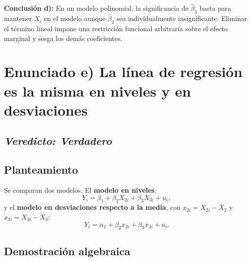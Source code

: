 \documentclass[12pt, letterpaper]{article}
\begin{document}
\begin{clave}
  \textbf{Conclusión d):} En un modelo polinomial, la significancia de
  $\hat{\beta}_3$ basta para mantener $X_i$ en el modelo aunque
  $\hat{\beta}_2$ sea individualmente insignificante. Eliminar el
  término lineal impone una restricción funcional arbitraria sobre el
  efecto marginal y sesga los demás coeficientes.
\end{clave}

\section{Enunciado e) La línea de regresión es la misma en niveles y en desviaciones}

\subsection*{\textit{Veredicto: \textbf{Verdadero}}}

\subsection{Planteamiento}

Se comparan dos modelos. El \textbf{modelo en niveles}:
\begin{equation}
  Y_i = \beta_1 + \beta_2 X_{2i} + \beta_3 X_{3i} + u_i,
  \label{eq:niveles}
\end{equation}
y el \textbf{modelo en desviaciones respecto a la media}, con
$x_{2i} = X_{2i} - \bar{X}_2$ y $x_{3i} = X_{3i} - \bar{X}_3$:
\begin{equation}
  Y_i = \alpha_1 + \beta_2 x_{2i} + \beta_3 x_{3i} + u_i.
  \label{eq:desviaciones}
\end{equation}

\subsection{Demostración algebraica}
\end{document}
